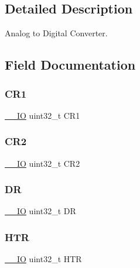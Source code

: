 \subsection{Detailed Description}
Analog to Digital Converter. 



\subsection{Field Documentation}
\mbox{\label{struct_a_d_c___type_def_ab0ec7102960640751d44e92ddac994f0}} 
\subsubsection{\texorpdfstring{CR1}{CR1}}
{\footnotesize\ttfamily \mbox{\hyperlink{core__sc300_8h_aec43007d9998a0a0e01faede4133d6be}{\+\_\+\+\_\+\+IO}} uint32\+\_\+t C\+R1}

\mbox{\label{struct_a_d_c___type_def_afdfa307571967afb1d97943e982b6586}} 
\subsubsection{\texorpdfstring{CR2}{CR2}}
{\footnotesize\ttfamily \mbox{\hyperlink{core__sc300_8h_aec43007d9998a0a0e01faede4133d6be}{\+\_\+\+\_\+\+IO}} uint32\+\_\+t C\+R2}

\mbox{\label{struct_a_d_c___type_def_a3df0d8dfcd1ec958659ffe21eb64fa94}} 
\subsubsection{\texorpdfstring{DR}{DR}}
{\footnotesize\ttfamily \mbox{\hyperlink{core__sc300_8h_aec43007d9998a0a0e01faede4133d6be}{\+\_\+\+\_\+\+IO}} uint32\+\_\+t DR}

\mbox{\label{struct_a_d_c___type_def_a24c3512abcc90ef75cf3e9145e5dbe9b}} 
\subsubsection{\texorpdfstring{HTR}{HTR}}
{\footnotesize\ttfamily \mbox{\hyperlink{core__sc300_8h_aec43007d9998a0a0e01faede4133d6be}{\+\_\+\+\_\+\+IO}} uint32\+\_\+t H\+TR}

